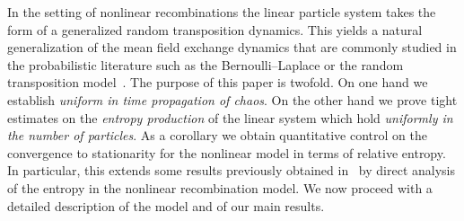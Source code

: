 \documentclass[AHL,Unicode,longabstracts,published]{cedram}
\begin{document}
In the setting of nonlinear recombinations the linear particle system takes the form of a generalized random transposition dynamics. This yields a natural generalization of the mean field exchange dynamics that are commonly studied in the probabilistic literature such as the Bernoulli--Laplace or the random transposition model~\cite{DiacShash}. The purpose of this paper is twofold. On one hand we establish \emph{uniform in time propagation of chaos}. On the other hand we prove tight estimates on the \emph{entropy production} of the linear system which hold \emph{uniformly in the number of particles}. As a corollary we obtain quantitative control on the convergence to stationarity for the nonlinear model in terms of relative entropy. In particular, this extends some results previously obtained in~\cite{entprod,Sinetal2} by direct analysis of the entropy in the nonlinear recombination model. We now proceed with a detailed description of the model and of our main results.
\end{document}
